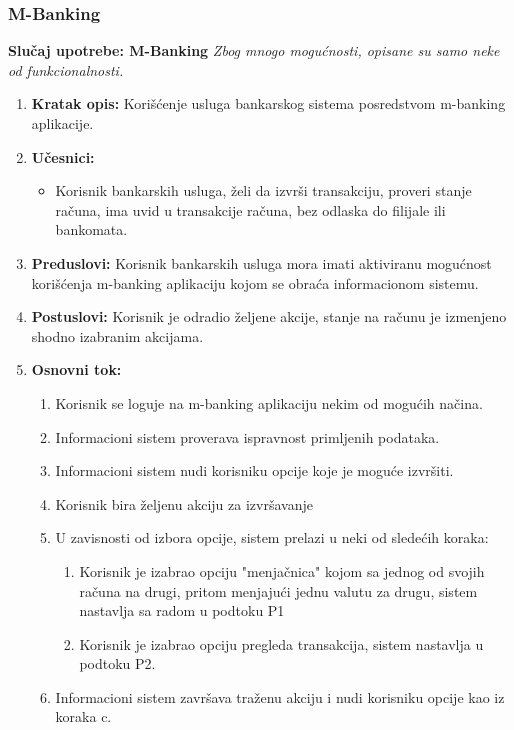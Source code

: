 \documentclass{article}
\begin{document}
\subsubsection{M-Banking}

\textbf{Slučaj upotrebe: M-Banking} 
\newline
\textit{Zbog mnogo mogućnosti, opisane su samo neke od funkcionalnosti.}

\begin{enumerate}
  \item \textbf{Kratak opis: }
    Korišćenje usluga bankarskog sistema posredstvom m-banking aplikacije.
  \item \textbf{Učesnici: }
    \begin{itemize}
        \item Korisnik bankarskih usluga, želi da izvrši transakciju, proveri stanje računa, ima uvid u transakcije računa, bez odlaska do filijale ili bankomata.
     \end{itemize}
  \item \textbf{Preduslovi: }
    Korisnik bankarskih usluga mora imati aktiviranu mogućnost korišćenja m-banking aplikaciju kojom se obraća informacionom sistemu.
  \item \textbf{Postuslovi: }
    Korisnik je odradio željene akcije, stanje na računu je izmenjeno shodno izabranim akcijama. 
  \item \textbf{Osnovni tok: }
    \begin{enumerate}
      \item Korisnik se loguje na m-banking aplikaciju nekim od mogućih načina.
      \item Informacioni sistem proverava ispravnost primljenih podataka.
      \item Informacioni sistem nudi korisniku opcije koje je moguće izvršiti. 
      \item Korisnik bira željenu akciju za izvršavanje
      \item U zavisnosti od izbora opcije, sistem prelazi u neki od sledećih koraka:  
      \begin{enumerate}
        \item Korisnik je izabrao opciju "menjačnica" kojom sa jednog od svojih računa na drugi, pritom menjajući jednu valutu za drugu, sistem nastavlja sa radom u podtoku P1
        \item Korisnik je izabrao opciju pregleda transakcija, sistem nastavlja u podtoku P2.
      \end{enumerate}
      \item Informacioni sistem završava traženu akciju i nudi korisniku opcije kao iz koraka c. 

\end{enumerate}
\end{enumerate}
\end{document}

